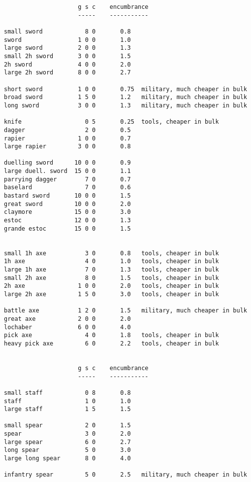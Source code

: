\small
\begin{verbatim}
                     g s c    encumbrance
                     -----    -----------

small sword            8 0       0.8
sword                1 0 0       1.0
large sword          2 0 0       1.3
small 2h sword       3 0 0       1.5
2h sword             4 0 0       2.0
large 2h sword       8 0 0       2.7

short sword          1 0 0       0.75  military, much cheaper in bulk
broad sword          1 5 0       1.2   military, much cheaper in bulk
long sword           3 0 0       1.3   military, much cheaper in bulk

knife                  0 5       0.25  tools, cheaper in bulk
dagger                 2 0       0.5
rapier               1 0 0       0.7
large rapier         3 0 0       0.8

duelling sword      10 0 0       0.9
large duell. sword  15 0 0       1.1
parrying dagger        7 0       0.7
baselard               7 0       0.6
bastard sword       10 0 0       1.5
great sword         10 0 0       2.0
claymore            15 0 0       3.0
estoc               12 0 0       1.3
grande estoc        15 0 0       1.5


small 1h axe           3 0       0.8   tools, cheaper in bulk
1h axe                 4 0       1.0   tools, cheaper in bulk
large 1h axe           7 0       1.3   tools, cheaper in bulk
small 2h axe           8 0       1.5   tools, cheaper in bulk
2h axe               1 0 0       2.0   tools, cheaper in bulk
large 2h axe         1 5 0       3.0   tools, cheaper in bulk

battle axe           1 2 0       1.5   military, much cheaper in bulk
great axe            2 0 0       2.0
lochaber             6 0 0       4.0
pick axe               4 0       1.8   tools, cheaper in bulk
heavy pick axe         6 0       2.2   tools, cheaper in bulk


                     g s c    encumbrance
                     -----    -----------

small staff            0 8       0.8
staff                  1 0       1.0
large staff            1 5       1.5

small spear            2 0       1.5
spear                  3 0       2.0
large spear            6 0       2.7
long spear             5 0       3.0
large long spear       8 0       4.0

infantry spear         5 0       2.5   military, much cheaper in bulk


\end{verbatim}
